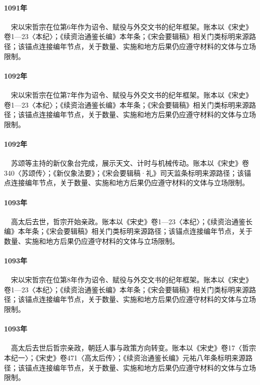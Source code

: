 \paragraph{1091年}　宋以宋哲宗在位第6年作为诏令、赋役与外交文书的纪年框架。账本以《宋史》卷1—23〈本纪〉；《续资治通鉴长编》本年条；《宋会要辑稿》相关门类标明来源路径；该锚点连接编年节点，关于数量、实施和地方后果仍应遵守材料的文体与立场限制。

\paragraph{1092年}　宋以宋哲宗在位第7年作为诏令、赋役与外交文书的纪年框架。账本以《宋史》卷1—23〈本纪〉；《续资治通鉴长编》本年条；《宋会要辑稿》相关门类标明来源路径；该锚点连接编年节点，关于数量、实施和地方后果仍应遵守材料的文体与立场限制。

\paragraph{1092年}　苏颂等主持的新仪象台完成，展示天文、计时与机械传动。账本以《宋史》卷340〈苏颂传〉；《新仪象法要》；《宋会要辑稿·礼》司天监条标明来源路径；该锚点连接编年节点，关于数量、实施和地方后果仍应遵守材料的文体与立场限制。

\paragraph{1093年}　高太后去世，哲宗开始亲政。账本以《宋史》卷1—23〈本纪〉；《续资治通鉴长编》本年条；《宋会要辑稿》相关门类标明来源路径；该锚点连接编年节点，关于数量、实施和地方后果仍应遵守材料的文体与立场限制。

\paragraph{1093年}　宋以宋哲宗在位第8年作为诏令、赋役与外交文书的纪年框架。账本以《宋史》卷1—23〈本纪〉；《续资治通鉴长编》本年条；《宋会要辑稿》相关门类标明来源路径；该锚点连接编年节点，关于数量、实施和地方后果仍应遵守材料的文体与立场限制。

\paragraph{1093年}　高太后去世后哲宗亲政，朝廷人事与政策方向转变。账本以《宋史》卷17〈哲宗本纪一〉；《宋史》卷471〈高太后传〉；《续资治通鉴长编》元祐八年条标明来源路径；该锚点连接编年节点，关于数量、实施和地方后果仍应遵守材料的文体与立场限制。

